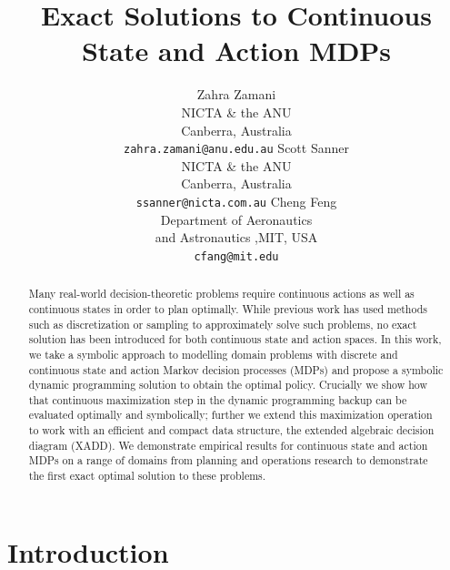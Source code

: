 \documentclass[letterpaper]{article}
\renewcommand{\-}{\text{-}}
\begin{document}
%
\title{Exact Solutions to Continuous State and Action MDPs}

\author{Zahra Zamani\\
NICTA \& the ANU\\
Canberra, Australia\\
{\tt zahra.zamani@anu.edu.au}
\And
Scott Sanner\\
NICTA \& the ANU\\
Canberra, Australia\\
{\tt ssanner@nicta.com.au}
\And
Cheng Feng\\
Department of Aeronautics \\
and Astronautics ,MIT, USA\\
{\tt cfang@mit.edu}
}
\maketitle

\begin{abstract}
Many real-world decision-theoretic problems require continuous actions as well as continuous 
states in order to plan optimally. While previous work has used methods such as discretization or 
sampling to approximately solve such problems, no exact solution has been introduced for both 
continuous state and action spaces. In this work, we take a symbolic approach to modelling domain 
problems with discrete and continuous state and action Markov decision processes (MDPs) and 
propose a symbolic dynamic programming solution to obtain the optimal policy. Crucially we show 
how that continuous maximization step in the dynamic programming backup can be evaluated 
optimally and symbolically; further we extend this maximization operation to work with an 
efficient and compact data structure, the extended algebraic decision diagram (XADD). We 
demonstrate empirical results for continuous state and action MDPs on a range of domains from 
planning and operations research to demonstrate the first exact optimal solution to these 
problems.
\end{abstract}


\section{Introduction}
\end{document}
